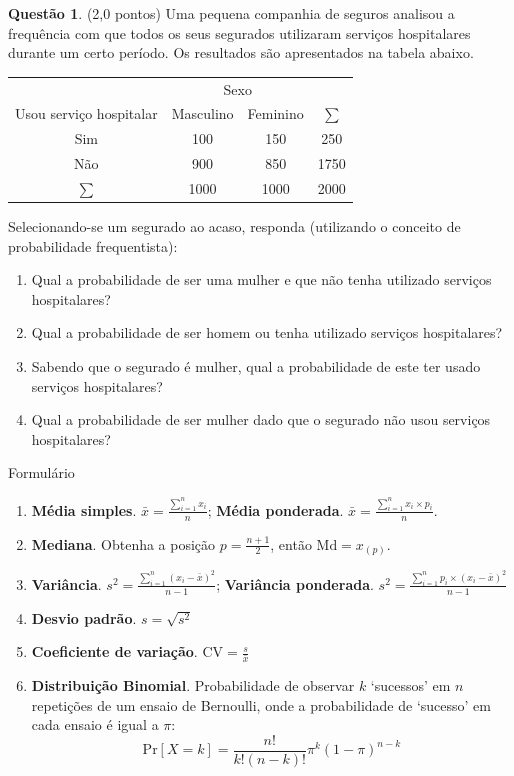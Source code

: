 \documentclass[a4paper,11pt]{article}
\theoremstyle{definition}
\newtheorem{exe}{Questão}
\begin{document}
\newpage
\medskip
\begin{exe} (2,0 pontos)
Uma pequena companhia de seguros analisou a frequência com que todos os seus 
segurados utilizaram serviços hospitalares durante um certo período. Os 
resultados são apresentados na tabela abaixo.
\begin{center}
\begin{tabular}{cccc}
\hline
  & \multicolumn{2}{c}{Sexo} & \\
\cline{2-3}
Usou serviço hospitalar & Masculino & Feminino & $\sum$ \\ \hline
Sim     & 100 & 150 & 250   \\
Não    & 900 & 850 & 1750  \\ \hline
$\sum$  & 1000 & 1000& 2000  \\ \hline
\end{tabular}
\end{center}
Selecionando-se um segurado ao acaso, responda (utilizando o conceito de 
probabilidade frequentista):
\begin{enumerate}
  \item Qual a probabilidade de ser uma mulher e que não tenha utilizado serviços hospitalares? \\
  \item Qual a probabilidade de ser homem ou tenha utilizado serviços hospitalares? \\
	\item Sabendo que o segurado é mulher, qual a probabilidade de este ter usado serviços hospitalares? \\
  \item Qual a probabilidade de ser mulher dado que o segurado não usou serviços hospitalares? \\
\end{enumerate}
\end{exe}

\bigskip
\begin{center}{\sc Formulário}\end{center}
\begin{enumerate}
	\item {\bf Média simples}. $\bar{x} = \frac{\sum_{i=1}^n x_i}{n} $; {\bf Média ponderada}. $\bar{x} = \frac{\sum_{i=1}^n x_i \times p_i}{n} $.
	\item {\bf Mediana}. Obtenha a posição $p = \frac{n+1}{2}$, então $\mbox{Md} = x_{(p)}$.
	\item {\bf Variância}. $s^2 = \frac{\sum_{i=1}^n (x_i - \bar{x})^2}{n-1} $; {\bf Variância ponderada}. $s^2 = \frac{\sum_{i=1}^n p_i \times (x_i - \bar{x})^2}{n-1} $ 
	\item {\bf Desvio padrão}. $s = \sqrt{s^2}$
	\item {\bf Coeficiente de variação}. $\mbox{CV} = \frac{s}{\bar{x}}$
	\item {\bf Distribuição Binomial}. Probabilidade de observar $k$ `sucessos' em $n$ repetições de um ensaio de Bernoulli, onde a probabilidade de `sucesso' em cada ensaio é igual a $\pi$: $$\mathrm{Pr}[X = k] = \frac{n!}{k!(n-k)!} \pi^k(1-\pi)^{n-k} $$
\end{enumerate}
\end{document}
